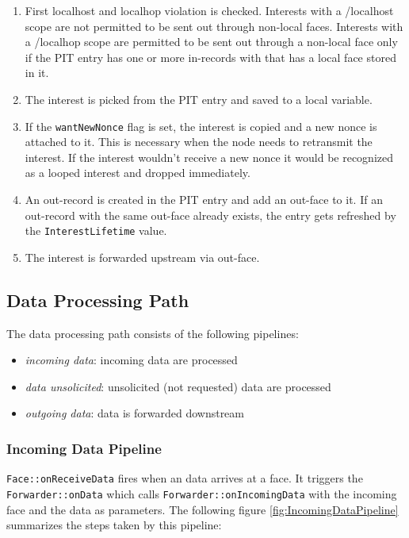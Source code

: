 \begin{enumerate}
\item First localhost and localhop violation is checked. Interests with a /localhost scope are not permitted to be sent out through non-local faces. Interests with a /localhop scope are permitted to be sent out through a non-local face only if the PIT entry has one or more in-records with that has a local face stored in it.
\item The interest is picked from the PIT entry and saved to a local variable.
\item If the \texttt{wantNewNonce} flag is set, the interest is copied and a new nonce is attached to it. This is necessary when the node needs to retransmit the interest. If the interest wouldn't receive a new nonce it would be recognized as a looped interest and dropped immediately.
\item An out-record is created in the PIT entry and add an out-face to it. If an out-record with the same out-face already exists, the entry gets refreshed by the \texttt{InterestLifetime} value.
\item The interest is forwarded upstream via out-face.
\end{enumerate}

\subsection{Data Processing Path}

The data processing path consists of the following pipelines:

\begin{itemize}
\item \emph{incoming data}: incoming data are processed
\item \emph{data unsolicited}: unsolicited (not requested) data are processed
\item \emph{outgoing data}: data is forwarded downstream
\end{itemize}

\subsubsection{Incoming Data Pipeline}

 \texttt{Face::onReceiveData} fires when an data arrives at a face. It triggers the  \texttt{Forwarder::onData} which calls \texttt{Forwarder::onIncomingData} with the incoming face and the data as parameters.
The following figure \ref{fig:IncomingDataPipeline} summarizes the steps taken by this pipeline:

